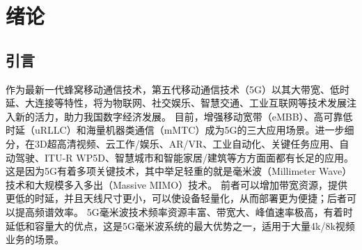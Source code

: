 \documentclass[supercite]{HustGraduPaper}
\begin{document}
\tableofcontents[indent=hustnoindent, level=3, pagenum=true]

\clearpage%

\section{绪论}

\subsection{引言}

作为最新一代蜂窝移动通信技术，第五代移动通信技术（5G）以其大带宽、低时延、大连接等特性，将为物联网、社交娱乐、智慧交通、工业互联网等技术发展注入新的活力，助力我国数字经济发展。
目前，增强移动宽带（eMBB）、高可靠低时延（uRLLC）和海量机器类通信（mMTC）成为5G的三大应用场景。进一步细分，在3D超高清视频、云工作/娱乐、AR/VR、工业自动化、关键任务应用、自动驾驶、ITU-R WP5D、智慧城市和智能家居/建筑等方方面面都有长足的应用。
这是因为5G有着多项关键技术，其中举足轻重的就是毫米波（Millimeter Wave）技术和大规模多入多出（Massive MIMO）技术。
前者可以增加带宽资源，提供更低的时延，并且天线尺寸更小，可以使设备轻量化，从而部署更为便捷；后者可以提高频谱效率。
5G毫米波技术频率资源丰富、带宽大、峰值速率极高，有着时延低和容量大的优点，这是5G毫米波系统的最大优势之一，适用于大量4k/8k视频业务的场景\cite{8732419}。
\end{document}
